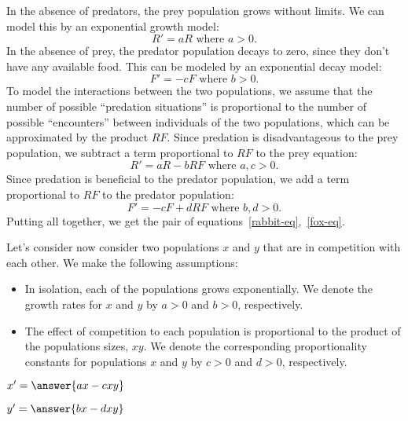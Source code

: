\documentclass{ximera}
\begin{document}
In the absence of predators, the prey population grows without limits. We can model this by an exponential growth model:
\[
R'=aR\text{ where $a>0$}.
\]
In the absence of prey, the predator population decays to zero, since they don't have any available food. This can be modeled by an exponential decay model:
\[
F'=-cF\text{ where $b>0$.}
\]
To model the interactions between the two populations, we assume that the number of possible ``predation situations'' is proportional to the number of possible ``encounters'' between individuals of the two populations, which can be approximated by the product $RF$.
Since predation is disadvantageous to the prey population, we subtract a term proportional to $RF$ to the prey equation:
\[
R'=aR-bRF\text{ where $a,c>0$}.
\]
Since predation is beneficial to the predator population, we add a term proportional to $RF$ to the predator population:
\[
F'=-cF+dRF\text{ where $b,d>0$.}
\]
Putting all together, we get the pair of equations~\ref{rabbit-eq},~\ref{fox-eq}.

\begin{problem}

Let's consider now consider two populations $x$ and $y$ that are in competition with each other. We make the following assumptions:
\begin{itemize}
\item In isolation, each of the populations grows exponentially. We denote the growth rates for $x$ and $y$ by $a>0$ and $b>0$, respectively. 
\item The effect of competition to each population is proportional to the product of the populations sizes, $xy$. We denote the corresponding proportionality constants for populations $x$ and $y$ by $c>0$ and $d>0$, respectively.
\end{itemize}

\begin{question}
$x'= \answer{ax-cxy}$
\end{question}
\begin{question}

$y'= \answer{bx-dxy}$
\end{question}
\end{problem}
\end{document}
